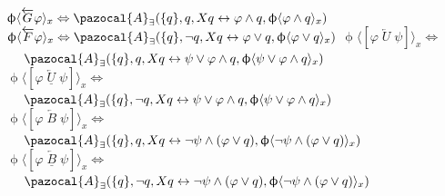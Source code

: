 \documentclass{article}
\newcommand{\Ab}{\pazocal{A}}
\begin{document}
\begin{multicols}{4}
$\upphi \langle \overleftarrow{G}\varphi\rangle_x \Leftrightarrow \Ab_\exists (\{q\},q, X q \leftrightarrow \varphi \wedge q,\upphi \langle \varphi \wedge q \rangle_x)$
$\upphi \langle \overleftarrow{F}\varphi\rangle_x \Leftrightarrow \Ab_\exists (\{q\},\neg q, X q \leftrightarrow \varphi \vee q,\upphi \langle \varphi \vee q \rangle_x)$
$\upphi \langle [\varphi \; \overleftarrow{U} \; \psi] \rangle_x \Leftrightarrow$ \\
$\ \ \ \ \Ab_\exists (\{q\},q, X q \leftrightarrow \psi \vee \varphi \wedge q, \upphi \langle \psi \vee \varphi \wedge q \rangle_x)$ \\
$\upphi \langle [\varphi \; \overleftarrow{\underline{U}} \; \psi] \rangle_x \Leftrightarrow$ \\ $\ \ \ \ \Ab_\exists (\{q\},\neg q, X q \leftrightarrow \psi \vee \varphi \wedge q, \upphi \langle \psi \vee \varphi \wedge q \rangle_x)$ \\
$\upphi \langle [\varphi\;\overleftarrow{B} \; \psi] \rangle_x \Leftrightarrow$ \\
$\ \ \ \ \Ab_\exists (\{q\},q, X q \leftrightarrow \neg\psi \wedge (\varphi \vee q), \upphi \langle \neg \psi \wedge (\varphi \vee q) \rangle_x)$ \\
$\upphi \langle [\varphi\;\underline{\overleftarrow{B}} \; \psi] \rangle_x \Leftrightarrow$ \\ $\ \ \ \ \Ab_\exists (\{q\},\neg q, X q \leftrightarrow \neg\psi \wedge (\varphi \vee q), \upphi \langle \neg \psi \wedge (\varphi \vee q) \rangle_x)$ \\


\end{multicols}
\end{document}
